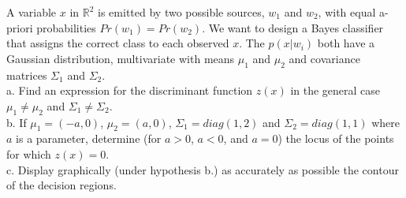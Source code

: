 \Exercise[number={14}]
A variable \(x\) in \(\mathbb{R}^2\) is emitted by two possible sources,
\(w_1\) and \(w_2\), with equal a-priori probabilities \(Pr(w_1)=Pr(w_2)\).
We want to design a Bayes classifier that assigns the correct class to
each observed \(x\). The \(p(x|w_i)\) both have a Gaussian distribution,
multivariate with means \(\mu_1\) and \(\mu_2\) and covariance
matrices \(\Sigma_1\) and \(\Sigma_2\).\\
a. Find an expression for the discriminant function \(z(x)\) in the
general case \(\mu_1\neq\mu_2\) and \(\Sigma_1\neq\Sigma_2\).\\
b. If \(\mu_1=(-a,0)\), \(\mu_2=(a,0)\), \(\Sigma_1=diag(1,2)\) and
\(\Sigma_2=diag(1,1)\) where \(a\) is a parameter, determine (for \(a>0\),
\(a<0\), and \(a=0\)) the locus of the points for which \(z(x)=0\).\\
c. Display graphically (under hypothesis b.) as accurately as possible
the contour of the decision regions.

